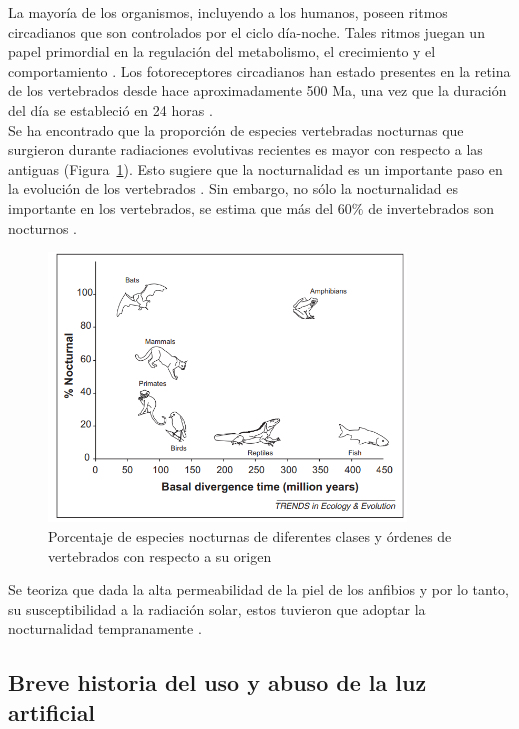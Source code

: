 La mayoría de los organismos, incluyendo a los humanos, poseen ritmos circadianos que son controlados por el ciclo día-noche. Tales ritmos juegan un papel primordial en la regulación del metabolismo, el crecimiento y el comportamiento \citep{Dunlap1999}. Los fotoreceptores circadianos han estado presentes en la retina de los vertebrados desde hace aproximadamente 500 Ma, una vez que la duración del día se estableció en 24 horas \citep{Conway2000,Longcore2006}.\\

Se ha encontrado que la proporción de especies vertebradas nocturnas que surgieron durante radiaciones evolutivas recientes es mayor con respecto a las antiguas (Figura~\ref{nocturnalidad}). Esto sugiere que la nocturnalidad es un importante paso en la evolución de los vertebrados \citep{Holker2010}. Sin embargo, no sólo la nocturnalidad es importante en los vertebrados, se estima que más del 60$\%$ de invertebrados son nocturnos \citep{Longcore2006}.


\begin{figure}[htb]
  \centering
    \includegraphics[width=95mm, scale=0.95]{nocturnalidad}
  \caption{Porcentaje de especies nocturnas de diferentes clases y órdenes de vertebrados con respecto a su origen \citep{Holker2010}}
  \label{nocturnalidad}
\end{figure}

Se teoriza que dada la alta permeabilidad de la piel de los anfibios y por lo tanto, su susceptibilidad a la radiación solar, estos tuvieron que adoptar la nocturnalidad tempranamente \citep{Holker2010}.

\newpage

\subsection{Breve historia del uso y abuso de la luz artificial}\\
\\

